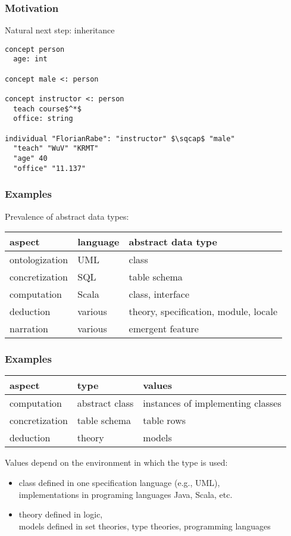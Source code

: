 \begin{frame}[fragile]\frametitle{Motivation}
Natural next step: inheritance

\begin{lstlisting}
concept person
  age: int
  
concept male <: person

concept instructor <: person
  teach course$^*$
  office: string

individual "FlorianRabe": "instructor" $\sqcap$ "male"
  "teach" "WuV" "KRMT"
  "age" 40
  "office" "11.137"
\end{lstlisting}

\end{frame}

\begin{frame}\frametitle{Examples}
Prevalence of abstract data types:

\begin{center}
\begin{tabular}{l|ll}
aspect & language & abstract data type \\
\hline
ontologization & UML & class \\
concretization & SQL & table schema \\
computation & Scala & class, interface \\
deduction & various & theory, specification, module, locale \\
narration & various & emergent feature
\end{tabular}
\end{center}

\end{frame}

\begin{frame}\frametitle{Examples}
\begin{center}
\begin{tabular}{l|ll}
aspect & type & values \\
\hline
computation & abstract class & instances of implementing classes \\
concretization & table schema & table rows \\
deduction & theory & models
\end{tabular}
\end{center}

Values depend on the environment in which the type is used:
\begin{itemize}
\item class defined in one specification language (e.g., UML), \\
 implementations in programing languages Java, Scala, etc.
\item theory defined in logic,\\
 models defined in set theories, type theories, programming languages
\end{itemize}
\end{frame}

